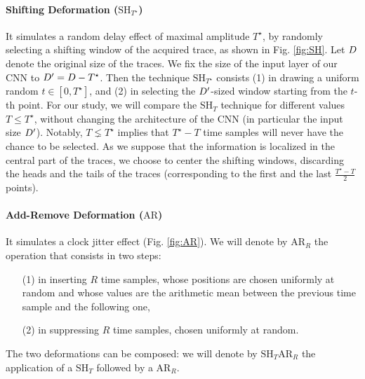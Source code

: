 \paragraph*{Shifting Deformation ($\mathrm{SH}_{T^\star}$)} It simulates a random delay effect of maximal amplitude $T^\star$, by randomly selecting  a shifting window of the acquired trace, as shown in Fig. \ref{fig:SH}. Let $D$ denote the original size of the traces. We fix the size of the input layer of our CNN to $D^\prime = D - T^\star$. Then the technique $\mathrm{SH}_{T^\star}$  consists (1) in drawing a uniform random $t \in[0,T^\star]$, and (2) in selecting the $D^\prime$-sized window starting from the $t$-th point. For our study, we will compare the $\mathrm{SH}_T$ technique for different values $T \leq T^\star$, without changing the architecture of the CNN (in particular the input size $D^\prime$). Notably, $T \lneq T^\star$ implies that $T^\star-T$ time samples will never have the chance to be selected. As we suppose that the information is localized in the central part of the traces, we choose to center the shifting windows, discarding the heads and the tails of the traces (corresponding to the first and the last $\frac{T^\star-T}{2}$ points). 

\paragraph*{Add-Remove Deformation ($\mathrm{AR}$)}  It simulates a clock jitter effect (Fig. \ref{fig:AR}). We will denote by $\mathrm{AR}_R$ the operation that consists in two steps:
\begin{itemize}
\item[(1)] in inserting $R$ time samples, whose positions are chosen uniformly at random and whose values are the arithmetic mean between the previous time sample and the following one,
\item[(2)] in suppressing $R$ time samples, chosen uniformly at random.\\
\end{itemize}

The two deformations can be composed: we will denote by $\mathrm{SH}_T\mathrm{AR}_R$ the application of a $\mathrm{SH}_T$ followed by a $\mathrm{AR}_R$.

%


